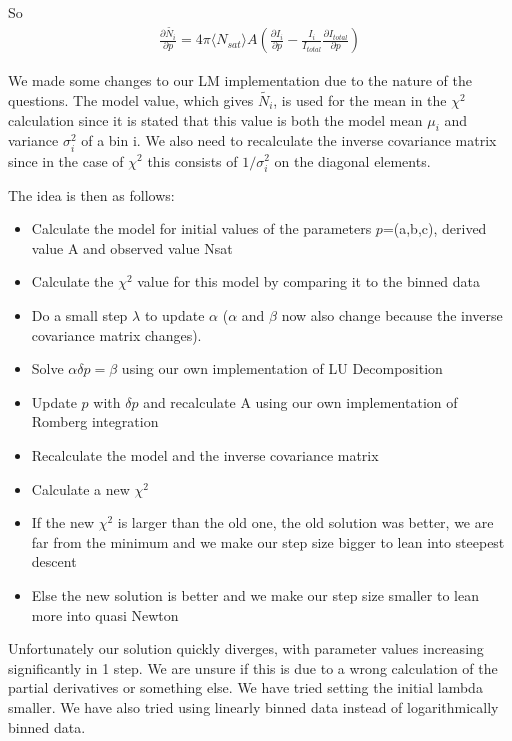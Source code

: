 \documentclass{article}
\begin{document}
So
\begin{align}
  \frac{\partial \tilde{N_i}}{\partial p} = 4 \pi \langle N_{sat} \rangle A \left(\frac{\partial I_i}{\partial p} - \frac{I_i}{I_{total}} \frac{\partial I_{total}}{\partial p}\right)
\end{align}

We made some changes to our LM implementation due to the nature of the questions.
The model value, which gives $\tilde{N_i}$, is used for the mean in the $\chi^2$ calculation since it is stated that this value is both the model mean $\mu_i$ and variance $\sigma_i^2$ of a bin i.
We also need to recalculate the inverse covariance matrix since in the case of $\chi^2$ this consists of $1/\sigma_i^2$ on the diagonal elements.


The idea is then as follows:
\begin{itemize}
  \item Calculate the model for initial values of the parameters $p$=(a,b,c), derived value A and observed value Nsat
  \item Calculate the $\chi^2$ value for this model by comparing it to the binned data
  \item Do a small step $\lambda$ to update $\alpha$ ($\alpha$ and $\beta$ now also change because the inverse covariance matrix changes).
  \item Solve $\alpha \delta p = \beta$ using our own implementation of LU Decomposition
  \item Update $p$ with $\delta p$ and recalculate A using our own implementation of Romberg integration
  \item Recalculate the model and the inverse covariance matrix
  \item Calculate a new $\chi^2$
  \item If the new $\chi^2$ is larger than the old one, the old solution was better, we are far from the minimum and we make our step size bigger to lean into steepest descent
  \item Else the new solution is better and we make our step size smaller to lean more into quasi Newton
\end{itemize}

Unfortunately our solution quickly diverges, with parameter values increasing significantly in 1 step. We are unsure if this is due to a wrong calculation of the partial derivatives or something else.
We have tried setting the initial lambda smaller. We have also tried using linearly binned data instead of logarithmically binned data.
\end{document}
